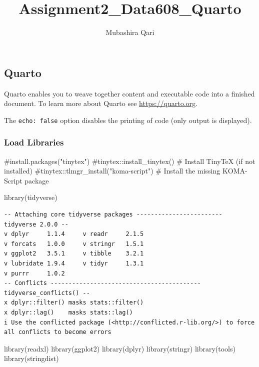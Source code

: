 \documentclass[
  letterpaper,
  DIV=11,
  numbers=noendperiod]{scrartcl}
\title{Assignment2\_Data608\_Quarto}
\author{Mubashira Qari}
\date{}
\newenvironment{Shaded}{\begin{snugshade}}{\end{snugshade}}
\newcommand{\CommentTok}[1]{\textcolor[rgb]{0.37,0.37,0.37}{#1}}
\newcommand{\FunctionTok}[1]{\textcolor[rgb]{0.28,0.35,0.67}{#1}}
\newcommand{\NormalTok}[1]{\textcolor[rgb]{0.00,0.23,0.31}{#1}}
\begin{document}
\maketitle

\subsection{Quarto}\label{quarto}

Quarto enables you to weave together content and executable code into a
finished document. To learn more about Quarto see
\url{https://quarto.org}.

The \texttt{echo:\ false} option disables the printing of code (only
output is displayed).

\subsubsection{Load Libraries}\label{load-libraries}

\begin{Shaded}
\begin{Highlighting}[]
\CommentTok{\#install.packages("tinytex")}
\CommentTok{\#tinytex::install\_tinytex()  \# Install TinyTeX (if not installed)}
\CommentTok{\#tinytex::tlmgr\_install("koma{-}script")  \# Install the missing KOMA{-}Script package}
\end{Highlighting}
\end{Shaded}

\begin{Shaded}
\begin{Highlighting}[]
\FunctionTok{library}\NormalTok{(tidyverse)}
\end{Highlighting}
\end{Shaded}

\begin{verbatim}
-- Attaching core tidyverse packages ------------------------ tidyverse 2.0.0 --
v dplyr     1.1.4     v readr     2.1.5
v forcats   1.0.0     v stringr   1.5.1
v ggplot2   3.5.1     v tibble    3.2.1
v lubridate 1.9.4     v tidyr     1.3.1
v purrr     1.0.2     
-- Conflicts ------------------------------------------ tidyverse_conflicts() --
x dplyr::filter() masks stats::filter()
x dplyr::lag()    masks stats::lag()
i Use the conflicted package (<http://conflicted.r-lib.org/>) to force all conflicts to become errors
\end{verbatim}

\begin{Shaded}
\begin{Highlighting}[]
\FunctionTok{library}\NormalTok{(readxl)}
\FunctionTok{library}\NormalTok{(ggplot2)}
\FunctionTok{library}\NormalTok{(dplyr)}
\FunctionTok{library}\NormalTok{(stringr)}
\FunctionTok{library}\NormalTok{(tools)}
\FunctionTok{library}\NormalTok{(stringdist)}
\end{Highlighting}
\end{Shaded}
\end{document}
